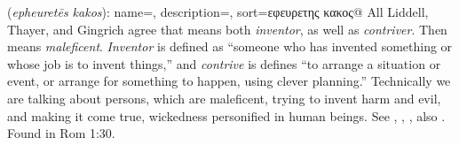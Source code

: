 \item[Maleficent contriver,]

(\textit{epheuretēs kakos}):
{
    name=,
    description={},
    sort=εφευρετης κακος@
}
All Liddell, Thayer, and Gingrich agree that  means both \emph{inventor}, as well as \emph{contriver}. Then  means \emph{maleficent}. \emph{Inventor} is defined as ``someone who has invented something or whose job is to invent things,'' and \emph{contrive} is defines ``to arrange a situation or event, or arrange for something to happen, using clever planning.'' Technically we are talking about persons, which are maleficent, trying to invent harm and evil, and making it come true, wickedness personified in human beings. 
See , , , also .
Found in Rom 1:30.
